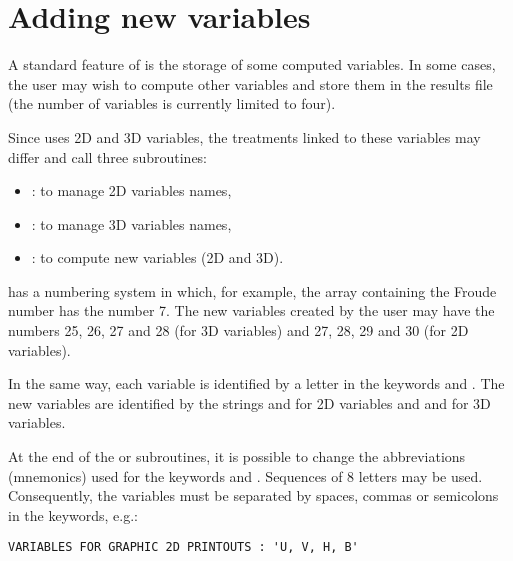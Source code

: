 \section{Adding new variables}
\label{sec:privarray}
A standard feature of  is the storage of some computed variables.
In some cases, the user may wish to compute other variables and store them
in the results file (the number of variables is currently limited to four).

Since  uses 2D and 3D variables, the treatments linked to these
variables may differ and call three subroutines:

\begin{itemize}
\item  {}: to manage 2D variables names,

\item  {}: to manage 3D variables names,

\item  {}: to compute new variables (2D and 3D).
\end{itemize}

 has a numbering system in which, for example, the array containing
the Froude number has the number 7. The new variables created by the user may
have the numbers 25, 26, 27 and 28 (for 3D variables) and 27, 28, 29 and 30
(for 2D variables).

In the same way, each variable is identified by a letter in the keywords
 and
.
The new variables are identified by the strings 
and  for 2D variables and  and 
for 3D variables.

At the end of the  or 
subroutines, it is
possible to change the abbreviations (mnemonics) used for the keywords
 and . Sequences of 8 letters may be used.
Consequently, the variables must be separated by spaces, commas or
semicolons in the keywords, e.g.:

\begin{lstlisting}[language=TelemacCas]
VARIABLES FOR GRAPHIC 2D PRINTOUTS : 'U, V, H, B'
\end{lstlisting}

